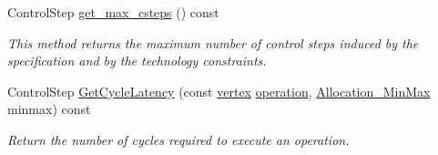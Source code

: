 \begin{DoxyCompactItemize}
Control\+Step \hyperlink{classASLAP_a24fbab3631c6145c42928625a6cfef01}{get\+\_\+max\+\_\+csteps} () const
\begin{DoxyCompactList}\small\item\em This method returns the maximum number of control steps induced by the specification and by the technology constraints. \end{DoxyCompactList}\item 
Control\+Step \hyperlink{classASLAP_a2d74ef008a1dd3b6bb59673afe419fac}{Get\+Cycle\+Latency} (const \hyperlink{graph_8hpp_abefdcf0544e601805af44eca032cca14}{vertex} \hyperlink{structoperation}{operation}, \hyperlink{allocation_8hpp_ac615dfccdc03f10d085f4fd1c4c7912b}{Allocation\+\_\+\+Min\+Max} minmax) const
\begin{DoxyCompactList}\small\item\em Return the number of cycles required to execute an operation. \end{DoxyCompactList}\end{DoxyCompactItemize}
